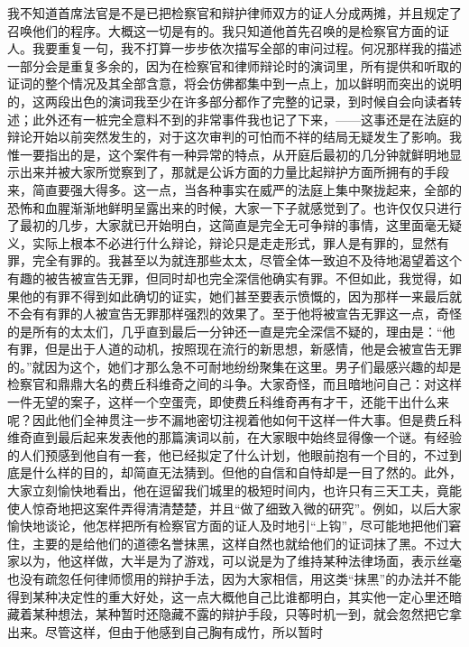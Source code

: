 \par 我不知道首席法官是不是已把检察官和辩护律师双方的证人分成两摊，并且规定了召唤他们的程序。大概这一切是有的。我只知道他首先召唤的是检察官方面的证人。我要重复一句，我不打算一步步依次描写全部的审问过程。何况那样我的描述一部分会是重复多余的，因为在检察官和律师辩论时的演词里，所有提供和听取的证词的整个情况及其全部含意，将会仿佛都集中到一点上，加以鲜明而突出的说明的，这两段出色的演词我至少在许多部分都作了完整的记录，到时候自会向读者转述；此外还有一桩完全意料不到的非常事件我也记了下来，——这事还是在法庭的辩论开始以前突然发生的，对于这次审判的可怕而不祥的结局无疑发生了影响。我惟一要指出的是，这个案件有一种异常的特点，从开庭后最初的几分钟就鲜明地显示出来并被大家所觉察到了，那就是公诉方面的力量比起辩护方面所拥有的手段来，简直要强大得多。这一点，当各种事实在威严的法庭上集中聚拢起来，全部的恐怖和血腥渐渐地鲜明呈露出来的时候，大家一下子就感觉到了。也许仅仅只进行了最初的几步，大家就已开始明白，这简直是完全无可争辩的事情，这里面毫无疑义，实际上根本不必进行什么辩论，辩论只是走走形式，罪人是有罪的，显然有罪，完全有罪的。我甚至以为就连那些太太，尽管全体一致迫不及待地渴望着这个有趣的被告被宣告无罪，但同时却也完全深信他确实有罪。不但如此，我觉得，如果他的有罪不得到如此确切的证实，她们甚至要表示愤慨的，因为那样一来最后就不会有有罪的人被宣告无罪那样强烈的效果了。至于他将被宣告无罪这一点，奇怪的是所有的太太们，几乎直到最后一分钟还一直是完全深信不疑的，理由是：“他有罪，但是出于人道的动机，按照现在流行的新思想，新感情，他是会被宣告无罪的。”就因为这个，她们才那么急不可耐地纷纷聚集在这里。男子们最感兴趣的却是检察官和鼎鼎大名的费丘科维奇之间的斗争。大家奇怪，而且暗地问自己：对这样一件无望的案子，这样一个空蛋壳，即使费丘科维奇再有才干，还能干出什么来呢？因此他们全神贯注一步不漏地密切注视着他如何干这样一件大事。但是费丘科维奇直到最后起来发表他的那篇演词以前，在大家眼中始终显得像一个谜。有经验的人们预感到他自有一套，他已经拟定了什么计划，他眼前抱有一个目的，不过到底是什么样的目的，却简直无法猜到。但他的自信和自恃却是一目了然的。此外，大家立刻愉快地看出，他在逗留我们城里的极短时间内，也许只有三天工夫，竟能使人惊奇地把这案件弄得清清楚楚，并且“做了细致入微的研究”。例如，以后大家愉快地谈论，他怎样把所有检察官方面的证人及时地引“上钩”，尽可能地把他们窘住，主要的是给他们的道德名誉抹黑，这样自然也就给他们的证词抹了黑。不过大家以为，他这样做，大半是为了游戏，可以说是为了维持某种法律场面，表示丝毫也没有疏忽任何律师惯用的辩护手法，因为大家相信，用这类“抹黑”的办法并不能得到某种决定性的重大好处，这一点大概他自己比谁都明白，其实他一定心里还暗藏着某种想法，某种暂时还隐藏不露的辩护手段，只等时机一到，就会忽然把它拿出来。尽管这样，但由于他感到自己胸有成竹，所以暂时